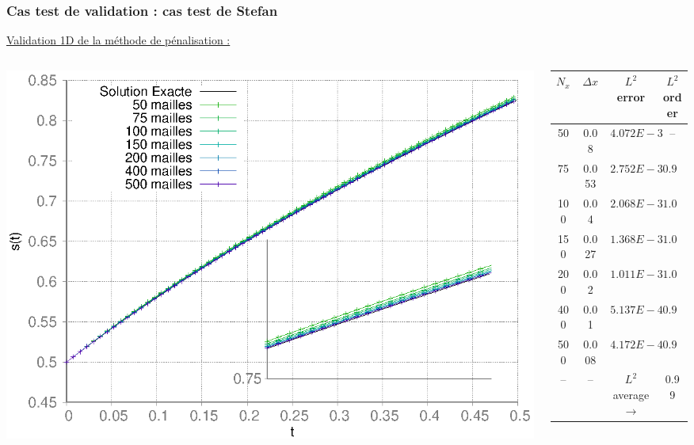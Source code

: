 \documentclass{beamer}
\begin{document}
\begin{frame}
    \frametitle{Cas test de validation : cas test de Stefan}
	\scriptsize
\color{cea_rouge}\underline{Validation 1D de la méthode de pénalisation :}\color{cea_texte}\\
\begin{columns}
\begin{column}{0.5 \textwidth}

        \includegraphics[width=1\textwidth]{Figures/StefanConvDX.eps}	




\end{column}
    \begin{column}{0.5 \textwidth}
\begin{table}
	\scriptsize
		\begin{tabular}{|c|c||cc|}
			\hline
			$N_x$ & $\Delta x$ & $L^2$ error & $L^2$ order \\
			\hline
			\hline
			50 	& 0.08  & $4.072E-3$ & --  \\
			75  & 0.053 & $2.752E-3$ & $0.95$  \\
			100 & 0.04  & $2.068E-3$ & $1.02$   \\
			150 & 0.027 & $1.368E-3$ & $1.05$   \\
			200 & 0.02  & $1.011E-3$ & $1.01$   \\
			400 & 0.01  & $5.137E-4$ & $0.98$   \\
			500 & 0.008 & $4.172E-4$ & $0.93$  \\
			\hline
			-- & --     &  $L^2$ average  $\rightarrow$ & 0.99 \\
			\hline
		\end{tabular}
\end{table}


\end{column}
\end{columns}
\end{frame}
\end{document}

